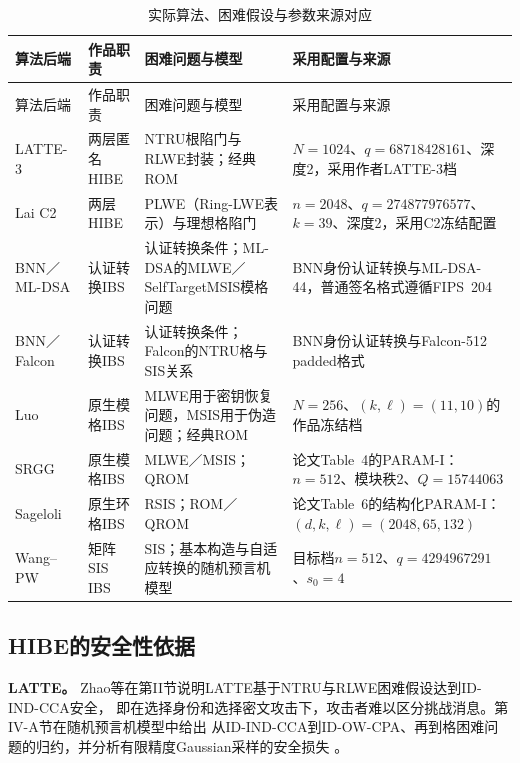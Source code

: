 \begin{longtable}{@{}>{\raggedright\arraybackslash}p{}>{\raggedright\arraybackslash}p{}>{\raggedright\arraybackslash}p{}>{\raggedright\arraybackslash}p{}@{}}
\caption{实际算法、困难假设与参数来源对应}\label{tab:assumption-source-map}\\
\toprule
\rowcolor{black!8} 算法后端 & 作品职责 & 困难问题与模型 & 采用配置与来源 \\
\midrule
\endfirsthead
\toprule
\rowcolor{black!8} 算法后端 & 作品职责 & 困难问题与模型 & 采用配置与来源 \\
\midrule
\endhead
LATTE-3 & 两层匿名HIBE & NTRU根陷门与RLWE封装；经典ROM & $N=1024$、$q=68718428161$、深度2，采用作者LATTE-3档\cite{zhao2024latte} \\
Lai C2 & 两层HIBE & PLWE（Ring-LWE表示）与理想格陷门 & $n=2048$、$q=274877976577$、$k=39$、深度2，采用C2冻结配置\cite{lai2015trapdoors} \\
BNN／ML-DSA & 认证转换IBS & 认证转换条件；ML-DSA的MLWE／SelfTargetMSIS模格问题 & BNN身份认证转换与ML-DSA-44，普通签名格式遵循FIPS~204\cite{galindo2006ibs,nist2024fips204} \\
BNN／Falcon & 认证转换IBS & 认证转换条件；Falcon的NTRU格与SIS关系 & BNN身份认证转换与Falcon-512 padded格式\cite{galindo2006ibs,falcon2020} \\
Luo & 原生模格IBS & MLWE用于密钥恢复问题，MSIS用于伪造问题；经典ROM & $N=256$、$(k,\ell)=(11,10)$的作品冻结档\cite{luo2024ibs} \\
SRGG & 原生模格IBS & MLWE／MSIS；QROM & 论文Table~4的PARAM-I：$n=512$、模块秩2、$Q=15744063$\cite{jia2025ibs} \\
Sageloli & 原生环格IBS & RSIS；ROM／QROM & 论文Table~6的结构化PARAM-I：$(d,k,\ell)=(2048,65,132)$\cite{sageloli2023ibs} \\
Wang--PW & 矩阵SIS IBS & SIS；基本构造与自适应转换的随机预言机模型 & 目标档$n=512$、$q=4294967291$、$s_0=4$\cite{wang2024ibme,pan2021ibs} \\
\bottomrule
\end{longtable}

\subsection{HIBE的安全性依据}
\textbf{LATTE。} Zhao等在第II节说明LATTE基于NTRU与RLWE困难假设达到ID-IND-CCA安全，
即在选择身份和选择密文攻击下，攻击者难以区分挑战消息。第IV-A节在随机预言机模型中给出
从ID-IND-CCA到ID-OW-CPA、再到格困难问题的归约，并分析有限精度Gaussian采样的安全损失
\cite{zhao2024latte}。

